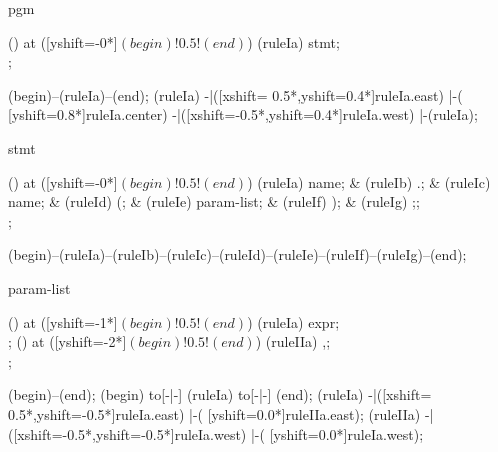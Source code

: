 \begin{syntax}{pgm}
  
  \node[sequence] () at ([yshift=-0*\syntaxruledist]$(begin)!0.5!(end)$) {
    \node[nonterminal]    (ruleIa) {stmt};
    \\
  };
  
  \draw[path] (begin)--(ruleIa)--(end);
  \draw[path] (ruleIa)
            -|([xshift= 0.5*\syntaxruledist,yshift=0.4*\syntaxruledist]ruleIa.east)
            |-(                            [yshift=0.8*\syntaxruledist]ruleIa.center)
            -|([xshift=-0.5*\syntaxruledist,yshift=0.4*\syntaxruledist]ruleIa.west)
            |-(ruleIa);
\end{syntax}
\begin{syntax}{stmt}
  
  \node[sequence] () at ([yshift=-0*\syntaxruledist]$(begin)!0.5!(end)$) {
    \node[nonterminal] (ruleIa) {name};
    &
    \node[terminal]    (ruleIb) {.};
    &
    \node[nonterminal] (ruleIc) {name};
    &
    \node[terminal]    (ruleId) {(};
    &
    \node[nonterminal] (ruleIe) {param-list};
    &
    \node[terminal]    (ruleIf) {)};
    &
    \node[terminal]    (ruleIg) {;};
    \\
  };
  
  \draw[path] (begin)--(ruleIa)--(ruleIb)--(ruleIc)--(ruleId)--(ruleIe)--(ruleIf)--(ruleIg)--(end);
\end{syntax}
\begin{syntax}{param-list}
  
  \node[sequence] () at ([yshift=-1*\syntaxruledist]$(begin)!0.5!(end)$) {
    \node[nonterminal] (ruleIa) {expr};
    \\
  };
  \node[sequence] () at ([yshift=-2*\syntaxruledist]$(begin)!0.5!(end)$) {
    \node[terminal] (ruleIIa) {,};
    \\
  };
  
  \draw[path] (begin)--(end);
  \draw[path] (begin) to[-|-] (ruleIa) to[-|-] (end);
  \draw[path] (ruleIa)
            -|([xshift= 0.5*\syntaxruledist,yshift=-0.5*\syntaxruledist]ruleIa.east)
            |-(                            [yshift=0.0*\syntaxruledist]ruleIIa.east);
  \draw[path] (ruleIIa)
            -|([xshift=-0.5*\syntaxruledist,yshift=-0.5*\syntaxruledist]ruleIa.west)
            |-(                            [yshift=0.0*\syntaxruledist]ruleIa.west);
\end{syntax}
